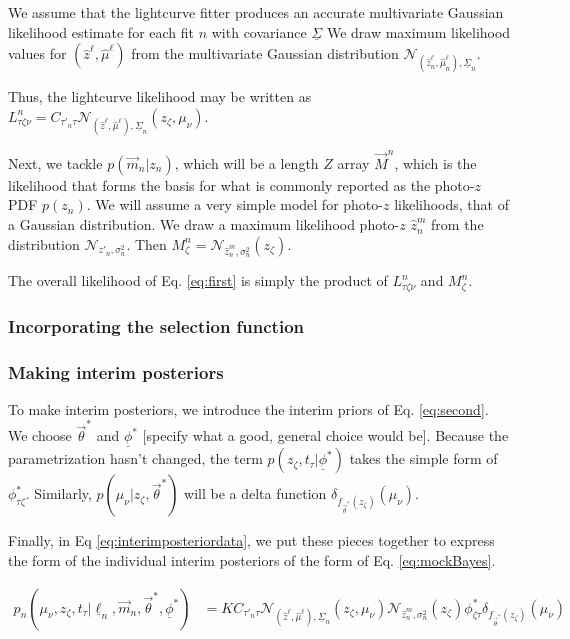 \documentclass[12pt, onecolumn]{emulateapj}
\newcommand{\textul}{\underline}
\begin{document}
We assume that the lightcurve fitter produces an accurate multivariate Gaussian likelihood estimate for each fit $n$ with covariance $\textul{\Sigma}$  We draw maximum likelihood values for $(\hat{z}^{\ell}, \hat{\mu}^{\ell})$ from the multivariate Gaussian distribution $\mathcal{N}_{(\hat{z}^{\ell}_{n}, \hat{\mu}^{\ell}_{n}), \textul{\Sigma}_{n}}$.  

Thus, the lightcurve likelihood may be written as $L^{n}_{\tau\zeta\nu} = C_{\tau'_{n}\tau}\mathcal{N}_{(\hat{z}^{\ell}, \hat{\mu}^{\ell}), \textul{\Sigma}_{n}}(z_{\zeta}, \mu_{\nu})$.

Next, we tackle $p(\vec{m}_{n} | z_{n})$, which will be a length $Z$ array $\vec{M}^{n}$, which is the likelihood that forms the basis for what is commonly reported as the photo-$z$ PDF $p(z_{n})$.   We will assume a very simple model for photo-$z$ likelihoods, that of a Gaussian distribution.  We draw a maximum likelihood photo-$z$ $\hat{z}_{n}^{m}$ from the distribution $\mathcal{N}_{z'_{n}, \sigma_{n}^{2}}$.  Then $M^{n}_{\zeta}=\mathcal{N}_{\hat{z}_{n}^{m}, \sigma_{n}^{2}}(z_{\zeta})$.

The overall likelihood of Eq. \ref{eq:first} is simply the product of $L^{n}_{\tau\zeta\nu}$ and $M^{n}_{\zeta}$.

\subsubsection{Incorporating the selection function}
\label{sec:selection}

\subsubsection{Making interim posteriors}
\label{sec:posteriors}

To make interim posteriors, we introduce the interim priors of Eq. \ref{eq:second}.  We choose $\vec{\theta}^{*}$ and $\textul{\phi}^{*}$ [specify what a good, general choice would be].  Because the parametrization hasn't changed, the term $p(z_{\zeta}, t_{\tau} | \textul{\phi}^{*})$ takes the simple form of $\phi^{*}_{\tau\zeta}$.  Similarly, $p(\mu_{\nu} | z_{\zeta}, \vec{\theta}^{*})$ will be a delta function $\delta_{f_{\vec{\theta}^{*}}(z_{\zeta})}(\mu_{\nu})$.  

Finally, in Eq \ref{eq:interimposteriordata}, we put these pieces together to express the form of the individual interim posteriors of the form of Eq. \ref{eq:mockBayes}.

\begin{align}
\label{eq:interimposteriordata}
p_{n}(\mu_{\nu}, z_{\zeta}, t_{\tau} | \textul{\ell}_{n}, \vec{m}_{n}, \vec{\theta}^{*}, \textul{\phi}^{*}) &= KC_{\tau'_{n}\tau}\mathcal{N}_{(\hat{z}^{\ell}, \hat{\mu}^{\ell}), \textul{\Sigma}_{n}}(z_{\zeta}, \mu_{\nu}) \mathcal{N}_{\hat{z}_{n}^{m}, \sigma_{n}^{2}}(z_{\zeta}) \phi^{*}_{\zeta\tau}\delta_{f_{\vec{\theta}^{*}}(z_{\zeta})}(\mu_{\nu})
\end{align}
\end{document}
